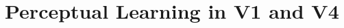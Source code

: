 \chapter{Perceptual Learning in {V1} and {V4}}

\graphicspath{{Chapters/MRes-report/}}





\graphicspath{{Chapters/decoding-chapter/}}


